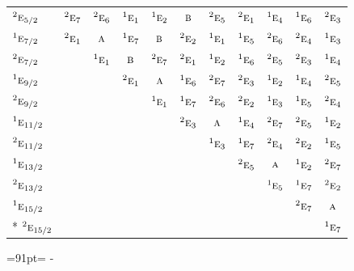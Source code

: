 \documentclass[10pt,a4paper]{article}
\newcommand{\needspace}[1]{\par\penalty-100\begingroup\dimen0=#1\relax\dimen2=\pagegoal
  \advance\dimen2-\pagetotal\ifdim\dimen0>\dimen2\relax\ifdim\dimen2>0pt\vfil\break\fi\fi
  \endgroup}
\numberwithin{equation}{section}
\newcommand{\irr}[1]{\text{\normalfont\scshape #1}}
\newcommand{\conjpair}[1]{{}^{#1}}
\begin{document}
{\begin{longtable}{@{}lcccccccccc@{}}
$\conjpair{2}\irr{e}_{5/2}$ & $\conjpair{2}\irr{e}_{7}$ & $\conjpair{2}\irr{e}_{6}$ & $\conjpair{1}\irr{e}_{1}$ & $\conjpair{1}\irr{e}_{2}$ & $\irr{b}$ & $\conjpair{2}\irr{e}_{5}$ & $\conjpair{2}\irr{e}_{1}$ & $\conjpair{1}\irr{e}_{4}$ & $\conjpair{1}\irr{e}_{6}$ & $\conjpair{2}\irr{e}_{3}$\\
$\conjpair{1}\irr{e}_{7/2}$ & $\conjpair{2}\irr{e}_{1}$ & $\irr{a}$ & $\conjpair{1}\irr{e}_{7}$ & $\irr{b}$ & $\conjpair{2}\irr{e}_{2}$ & $\conjpair{1}\irr{e}_{1}$ & $\conjpair{1}\irr{e}_{5}$ & $\conjpair{2}\irr{e}_{6}$ & $\conjpair{2}\irr{e}_{4}$ & $\conjpair{1}\irr{e}_{3}$\\
$\conjpair{2}\irr{e}_{7/2}$ &  & $\conjpair{1}\irr{e}_{1}$ & $\irr{b}$ & $\conjpair{2}\irr{e}_{7}$ & $\conjpair{2}\irr{e}_{1}$ & $\conjpair{1}\irr{e}_{2}$ & $\conjpair{1}\irr{e}_{6}$ & $\conjpair{2}\irr{e}_{5}$ & $\conjpair{2}\irr{e}_{3}$ & $\conjpair{1}\irr{e}_{4}$\\
$\conjpair{1}\irr{e}_{9/2}$ &  &  & $\conjpair{2}\irr{e}_{1}$ & $\irr{a}$ & $\conjpair{1}\irr{e}_{6}$ & $\conjpair{2}\irr{e}_{7}$ & $\conjpair{2}\irr{e}_{3}$ & $\conjpair{1}\irr{e}_{2}$ & $\conjpair{1}\irr{e}_{4}$ & $\conjpair{2}\irr{e}_{5}$\\
$\conjpair{2}\irr{e}_{9/2}$ &  &  &  & $\conjpair{1}\irr{e}_{1}$ & $\conjpair{1}\irr{e}_{7}$ & $\conjpair{2}\irr{e}_{6}$ & $\conjpair{2}\irr{e}_{2}$ & $\conjpair{1}\irr{e}_{3}$ & $\conjpair{1}\irr{e}_{5}$ & $\conjpair{2}\irr{e}_{4}$\\
$\conjpair{1}\irr{e}_{11/2}$ &  &  &  &  & $\conjpair{2}\irr{e}_{3}$ & $\irr{a}$ & $\conjpair{1}\irr{e}_{4}$ & $\conjpair{2}\irr{e}_{7}$ & $\conjpair{2}\irr{e}_{5}$ & $\conjpair{1}\irr{e}_{2}$\\
$\conjpair{2}\irr{e}_{11/2}$ &  &  &  &  &  & $\conjpair{1}\irr{e}_{3}$ & $\conjpair{1}\irr{e}_{7}$ & $\conjpair{2}\irr{e}_{4}$ & $\conjpair{2}\irr{e}_{2}$ & $\conjpair{1}\irr{e}_{5}$\\
$\conjpair{1}\irr{e}_{13/2}$ &  &  &  &  &  &  & $\conjpair{2}\irr{e}_{5}$ & $\irr{a}$ & $\conjpair{1}\irr{e}_{2}$ & $\conjpair{2}\irr{e}_{7}$\\
$\conjpair{2}\irr{e}_{13/2}$ &  &  &  &  &  &  &  & $\conjpair{1}\irr{e}_{5}$ & $\conjpair{1}\irr{e}_{7}$ & $\conjpair{2}\irr{e}_{2}$\\
$\conjpair{1}\irr{e}_{15/2}$ &  &  &  &  &  &  &  &  & $\conjpair{2}\irr{e}_{7}$ & $\irr{a}$\\*
$\conjpair{2}\irr{e}_{15/2}$ &  &  &  &  &  &  &  &  &  & $\conjpair{1}\irr{e}_{7}$\\
\bottomrule\end{longtable}}
\needspace{91pt}
\end{document}
